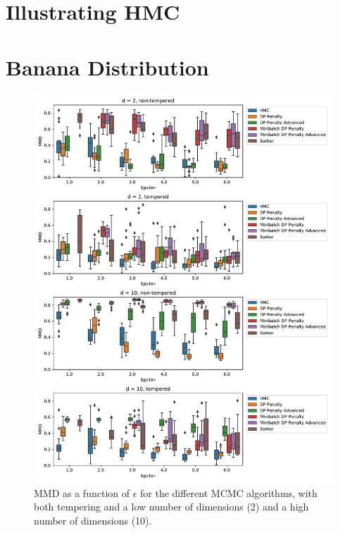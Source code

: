 \documentclass[english,twoside,openright]{HYgraduMLDS}
\begin{document}
\section{Illustrating HMC}
\section{Banana Distribution}

\begin{figure}
  \centering
  \includegraphics[width=\textwidth]{figures/banana_mmd.pdf}
  \caption{
    MMD as a function of \(\epsilon\) for the different MCMC algorithms,
    with both tempering and a low number of dimensions (2) and a high number
    of dimensions (10).
  }
  \label{banana_mmd_fig}

\end{figure}
\end{document}
